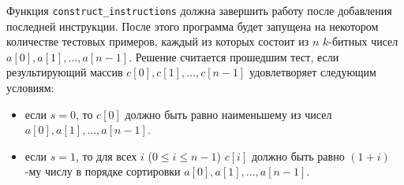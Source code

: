 Функция \texttt{construct\_instructions} должна завершить работу после добавления последней инструкции. После этого программа будет запущена на некотором количестве тестовых примеров, каждый из которых состоит из $n$ $k$-битных чисел $a[0], a[1], \ldots, a[n-1]$.
Решение считается прошедшим тест, если результирующий массив $c[0], c[1], \ldots, c[n-1]$ удовлетворяет следующим условиям:
\begin{itemize}
\item если $s = 0$, то $c[0]$ должно быть равно наименьшему из чисел $a[0], a[1], \ldots, a[n-1]$.
\item если $s = 1$, то для всех $i$ ($0\leq i\leq n-1$) $c[i]$ должно быть равно $(1+i)$-му числу в порядке сортировки $a[0],a[1],\ldots, a[n-1]$.
\end{itemize}

